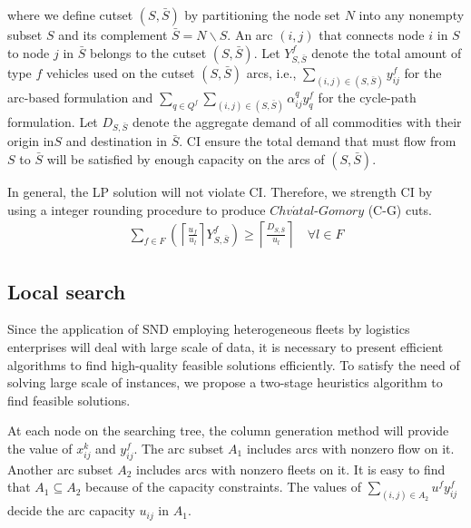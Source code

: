\documentclass[11pt,nonblindrev,fleqn]{article}
\begin{document}
where we define cutset $(S,\bar{S})$ by partitioning the node set $N$ into any nonempty subset $S$ and its complement $\bar{S}=N\backslash S$. An arc $(i,j)$ that connects node $i$ in $S$ to node $j$ in $\bar{S}$  belongs to the cutset $(S,\bar{S})$. Let $Y_{S,\bar{S}}^f$ denote the total amount of type $f$ vehicles used on the cutset $(S,\bar{S})$ arcs, i.e., $\sum_{(i,j)\in (S,\bar{S})} y_{ij}^f$ for the arc-based formulation and $\sum_{q\in Q^f}\sum_{(i,j)\in (S,\bar{S})} \alpha_{ij}^q y_q^f $ for the cycle-path formulation. Let $D_{S,\bar{S}}$ denote the aggregate demand of all commodities with their origin in$S$ and destination in $\bar{S}$. CI ensure the total demand that must flow from $S$ to $\bar{S}$ will be satisfied by enough capacity on the arcs of $(S,\bar{S})$.

In general, the LP solution will not violate CI. Therefore, we strength CI by using a integer rounding procedure to produce $Chv\acute{a}tal$-$Gomory$ (C-G) cuts.
\begin{align}
  \sum_{f\in F} \left( \left \lceil \frac{u_f}{u_l} \right \rceil Y_{S,\bar{S}}^f  \right)  \geq \left\lceil \frac{D_{S,\bar{S}}}{u_l} \right\rceil  \quad   \forall l\in F
\end{align}
\subsection{Local search}
Since the application of SND employing heterogeneous fleets by logistics enterprises will deal with large scale of data, it is necessary to present efficient algorithms to find high-quality feasible solutions efficiently. To satisfy the need of solving large scale of instances, we propose a two-stage heuristics algorithm to find feasible solutions.

At each node on the searching tree, the column generation method will provide the value of $x_{ij}^k$ and $y_{ij}^f$. The arc subset $A_1$ includes arcs with nonzero flow on it. Another arc subset $A_2$ includes arcs with nonzero fleets on it. It is easy to find that $A_1\subseteq A_2$ because of the capacity constraints. The values of $\sum_{(i,j)\in A_2}u^f y_{ij}^f $ decide the arc capacity $u_{ij}$ in $A_1$.
\end{document}
